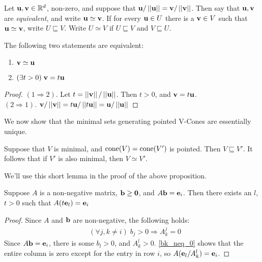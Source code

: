 \begin{Def}
	Let $\mathbf{u},\mathbf{v} \in \mathbb{R}^d$, non-zero, and suppose that $\mathbf{u}/\left|\left|\mathbf{u}\right|\right| = \mathbf{v}/\left|\left|\mathbf{v}\right|\right|$.  Then say that $\mathbf{u},\mathbf{v}$ are \textit{equivalent}, and write $\mathbf{u} \simeq \mathbf{v}$.  If for every $\mathbf{u}\in U$ there is a $\mathbf{v}\in V$ such that $\mathbf{u}\simeq\mathbf{v}$, write $ U \sqsubseteq V$.  Write $U \simeq V$ if $U \sqsubseteq V$ and $V \sqsubseteq U$.
\end{Def}

\begin{Prop}\label{vector_equivalence}
	The following two statements are equivalent:
	\begin{enumerate}
		\item $\mathbf{v}\simeq\mathbf{u}$
		\item $(\exists t>0)\;\mathbf{v}=t\mathbf{u}$
	\end{enumerate}
\end{Prop}

\begin{proof}
	$(1\Rightarrow 2)$.  Let $t=\left|\left|\mathbf{v}\right|\right|/\left|\left|\mathbf{u}\right|\right|$.  Then $t>0$, and $\mathbf{v}=t\mathbf{u}$.\\
	$(2\Rightarrow 1)$.  $\mathbf{v}/\left|\left|\mathbf{v}\right|\right| = t\mathbf{u}/\left|\left|t\mathbf{u}\right|\right| = \mathbf{u}/\left|\left|\mathbf{u}\right|\right|$
\end{proof}

We now show that the minimal sets generating pointed V-Cones are essentially unique.

\begin{Prop}\label{min_pointed_generators}
	Suppose that $V$ is minimal, and $\operatorname{cone}(V) = \operatorname{cone}(V')$ is pointed.  Then $V\sqsubseteq V'$.  It follows that if $V'$ is also minimal, then $V\simeq V'$.
\end{Prop}

We'll use this short lemma in the proof of the above proposition.

\begin{Lemma}\label{non_negative_sums_to_e}
	Suppose $A$ is a non-negative matrix, $\mathbf{b}\geq\mathbf{0}$, and $A\mathbf{b} = \mathbf{e}_i$.  Then there exists an $l$, $t>0$ such that $A(t\mathbf{e}_l) = \mathbf{e}_i$
\end{Lemma}

\begin{proof}
	Since $A$ and $\mathbf{b}$ are non-negative, the following holds:
	\begin{align}
		 & (\forall j,k\neq i)\; b_j   > 0 \Rightarrow A_k^j = 0 \label{bk_neq_0}
	\end{align}
	Since $A\mathbf{b}=\mathbf{e}_i$, there is some $b_l > 0$, and $A_k^l > 0$.  \eqref{bk_neq_0} shows that the entire column is zero except for the entry in row $i$, so $A(\mathbf{e}_l/A_k^l) = \mathbf{e}_i$.
\end{proof}

